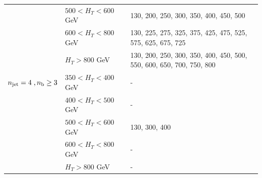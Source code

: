 \begin{table}[h!]
\begin{tabular}{ lll }
     & $500 < H_{T} < 600$ GeV & 130, 200, 250, 300, 350, 400, 450, 500 \\ 
     & $600 < H_{T} < 800$ GeV & 130, 225, 275, 325, 375, 425, 475, 525, 575, 625, 675, 725 \\ 
     & $H_{T} > 800$ GeV & 130, 200, 250, 300, 350, 400, 450, 500, 550, 600, 650, 700, 750, 800 \\ 
    \hline
    $n_{\text{jet}} = 4 \;, n_{\text{b}} \geq 3$ & $350 < H_{T} < 400$ GeV & - \\ 
     & $400 < H_{T} < 500$ GeV & - \\ 
     & $500 < H_{T} < 600$ GeV & 130, 300, 400 \\ 
     & $600 < H_{T} < 800$ GeV & - \\ 
     & $H_{T} > 800$ GeV & - \\ 

  \end{tabular}
\end{table}


